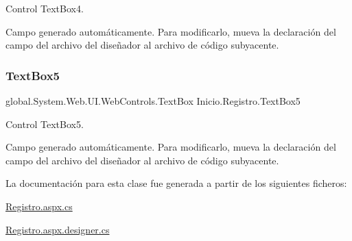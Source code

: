 Control Text\+Box4. 

Campo generado automáticamente. Para modificarlo, mueva la declaración del campo del archivo del diseñador al archivo de código subyacente. \mbox{\label{classInicio_1_1Registro_a9bc70ac4aacbc0573d097586b9663f28}} 
\subsubsection{\texorpdfstring{TextBox5}{TextBox5}}
{\footnotesize\ttfamily global.\+System.\+Web.\+U\+I.\+Web\+Controls.\+Text\+Box Inicio.\+Registro.\+Text\+Box5\hspace{0.3cm}{\ttfamily [protected]}}



Control Text\+Box5. 

Campo generado automáticamente. Para modificarlo, mueva la declaración del campo del archivo del diseñador al archivo de código subyacente. 

La documentación para esta clase fue generada a partir de los siguientes ficheros\+:\begin{DoxyCompactItemize}
\item 
\mbox{\hyperlink{Registro_8aspx_8cs}{Registro.\+aspx.\+cs}}\item 
\mbox{\hyperlink{Registro_8aspx_8designer_8cs}{Registro.\+aspx.\+designer.\+cs}}\end{DoxyCompactItemize}
